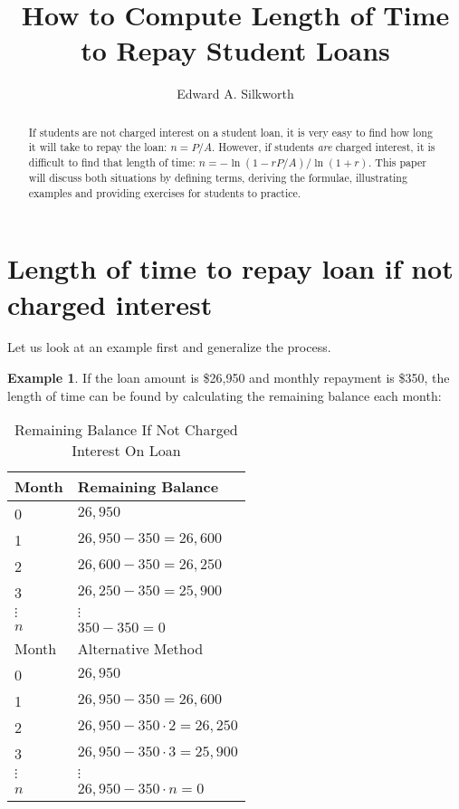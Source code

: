 \documentclass[12pt,letterpaper]{amsart}
\theoremstyle{definition} %
\newtheorem{example}[theorem]{Example}
\begin{document}
\title{How to Compute Length of Time to Repay Student Loans}
\author{Edward A. Silkworth}
\address{Teachers College, Columbia University, 525 West 120th Street, New York, NY 10027}

\begin{abstract}If students are not charged interest on a student loan, it is very easy to find how long it will take to repay the loan: $n=P/A$. However, if students \textit{are} charged interest, it is difficult to find that length of time: $n=-\ln{(1-rP/A)}/\ln{(1+r)}$. This paper will discuss both situations by defining terms, deriving the formulae, illustrating examples and providing exercises for students to practice.\end{abstract}

\maketitle

\section{Length of time to repay loan if not charged interest}
Let us look at an example first and generalize the process.

\begin{example}If the loan amount is \$26,950 and monthly repayment is \$350, the length of time can be found by calculating the remaining balance each month:\end{example} %

\begin{table}[h]\caption{Remaining Balance If Not Charged Interest On Loan}\begin{tabular}{l|l} %
\hline\hline
Month			&	Remaining Balance\\
\hline
0				&	$26,950$\\ %
1				&	$26,950-350=26,600$\\
2				&	$26,600-350=26,250$\\
3				&	$26,250-350=25,900$\\
$\vdots$	&	$\vdots$\\
$n$			&	$350-350=0$\\
\hline
Month			&	Alternative Method\\
\hline
0				&	$26,950$\\
1				&	$26,950-350=26,600$\\
2				&	$26,950-350\cdot 2=26,250$\\
3				&	$26,950-350\cdot 3=25,900$\\
$\vdots$	&	$\vdots$\\
$n$			&	$26,950-350\cdot n=0$\\
\hline
\end{tabular}\end{table}
\end{document}
